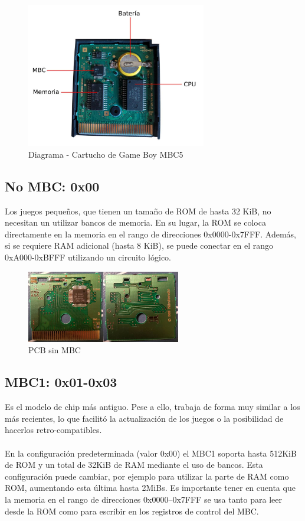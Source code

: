\begin{figure}[H]
    \centering
    \includegraphics[width=0.7\textwidth]{include/images/cart.jpg}
    \caption{Diagrama - Cartucho de Game Boy MBC5}
    \label{figure:cart_gameboy}
\end{figure}

\subsection{No MBC: 0x00} Los juegos pequeños, que tienen un tamaño de ROM de hasta 32 KiB, no necesitan un utilizar bancos de memoria. En su lugar, la ROM se coloca directamente en la memoria en el rango de direcciones 0x0000-0x7FFF. Además, si se requiere RAM adicional (hasta 8 KiB), se puede conectar en el rango 0xA000-0xBFFF utilizando un circuito lógico.

\begin{figure}[H]
    \centering
    \includegraphics[width=0.6\textwidth]{include/images/nombc.jpg}
    \caption{PCB sin MBC}
    \label{figure:cart_no_mbc}
\end{figure}

\subsection{MBC1: 0x01-0x03} Es el modelo de chip más antiguo. Pese a ello, trabaja de forma muy similar a los más recientes, lo que facilitó la actualización de los juegos o la posibilidad de hacerlos retro-compatibles.
\\\\
En la configuración predeterminada (valor 0x00) el MBC1 soporta hasta 512KiB de ROM y un total de 32KiB de RAM mediante el uso de bancos. Esta configuración puede cambiar, por ejemplo para utilizar la parte de RAM como ROM, aumentando esta última hasta 2MiBs. Es importante tener en cuenta que la memoria en el rango de direcciones 0x0000–0x7FFF se usa tanto para leer desde la ROM como para escribir en los registros de control del MBC.

